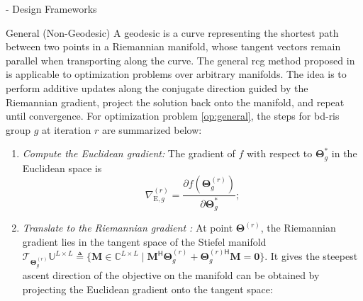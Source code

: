 \documentclass[journal]{IEEEtran}
\begin{document}
\begin{section}{- Design Frameworks}
	\begin{subsection}{General (Non-Geodesic) }
		A geodesic is a curve representing the shortest path between two points in a Riemannian manifold, whose tangent vectors remain parallel when transporting along the curve.
		The general \gls{rcg} method proposed in \cite{Absil2009,Pan2022d} is applicable to optimization problems over arbitrary manifolds.
		The idea is to perform {additive} updates along the conjugate direction guided by the Riemannian gradient, {project} the solution back onto the manifold, and repeat until convergence.
		For optimization problem \eqref{op:general}, the steps for \gls{bd}-\gls{ris} group $g$ at iteration $r$ are summarized below:
		\begin{enumerate}
			\item \emph{Compute the Euclidean gradient:} The gradient of $f$ with respect to $\mathbf{\Theta}_g^*$ in the Euclidean space is
			\begin{equation}
				\nabla_{\mathrm{E},g}^{(r)} = \frac{\partial f(\mathbf{\Theta}_g^{(r)})}{\partial \mathbf{\Theta}_g^*};
				\label{eq:gradient_euclidean}
			\end{equation}
			\item \emph{Translate to the Riemannian gradient \cite{Absil2009}:} At point $\mathbf{\Theta}^{(r)}$, the Riemannian gradient lies in the tangent space of the Stiefel manifold $\mathcal{T}_{\mathbf{\Theta}_g^{(r)}}\mathbb{U}^{L \times L} \triangleq \{\mathbf{M} \in \mathbb{C}^{L \times L} \mid \mathbf{M}^\mathsf{H} \mathbf{\Theta}_g^{(r)} + {\mathbf{\Theta}_g^{(r)\mathsf{H}}} \mathbf{M} = \mathbf{0}\}$. It gives the steepest ascent direction of the objective on the manifold can be obtained by projecting the Euclidean gradient onto the tangent space:
			\begin{equation}

\end{equation}
\end{enumerate}
\end{subsection}
\end{section}
\end{document}
